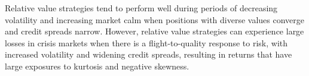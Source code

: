 \documentclass[11pt]{article}
\begin{document}
Relative value strategies tend to perform well during periods of decreasing volatility and increasing market calm when positions with diverse values converge and credit spreads narrow. However, relative value strategies can experience large losses in crisis markets when there is a flight-to-quality response to risk, with increased volatility and widening credit spreads, resulting in returns that have large exposures to kurtosis and negative skewness.
\end{document}
